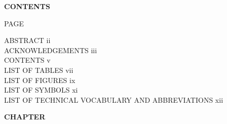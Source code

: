 \newpage
\thispagestyle{empty}

\begin{center}
\fontsize{12}{18}\bfseries\selectfont
CONTENTS
\end{center}

\vspace{6pt}

\hfill\fontsize{12}{18}\selectfont PAGE

\vspace{6pt}

\fontsize{12}{18}\selectfont
\noindent ABSTRACT \dotfill ii\\
\noindent ACKNOWLEDGEMENTS \dotfill iii\\
\noindent CONTENTS \dotfill v\\
\noindent LIST OF TABLES \dotfill vii\\
\noindent LIST OF FIGURES \dotfill ix\\
\noindent LIST OF SYMBOLS \dotfill xi\\
\noindent LIST OF TECHNICAL VOCABULARY AND ABBREVIATIONS \dotfill xii\\

\vspace{6pt}

\noindent\fontsize{12}{18}\bfseries\selectfont CHAPTER

\vspace{6pt}

{\fontsize{12}{18}\selectfont
\makeatletter
\afterpage{\thispagestyle{contentscont}}
\makeatother}